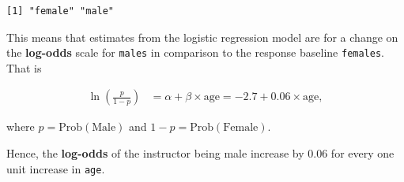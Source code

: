 \documentclass[
  letterpaper,
  DIV=11,
  numbers=noendperiod]{scrartcl}
\newenvironment{Shaded}{\begin{snugshade}}{\end{snugshade}}
\newcommand{\FunctionTok}[1]{\textcolor[rgb]{0.28,0.35,0.67}{#1}}
\newcommand{\NormalTok}[1]{\textcolor[rgb]{0.00,0.23,0.31}{#1}}
\newcommand{\SpecialCharTok}[1]{\textcolor[rgb]{0.37,0.37,0.37}{#1}}
\begin{document}
\begin{Shaded}
\end{Shaded}

\begin{verbatim}
[1] "female" "male"  
\end{verbatim}

This means that estimates from the logistic regression model are for a
change on the \textbf{log-odds} scale for \texttt{males} in comparison
to the response baseline \texttt{females}. That is

\begin{align}
\ln\left(\frac{p}{1-p}\right) &= \alpha + \beta \times \textrm{age} = -2.7 + 0.06 \times \textrm{age}, \nonumber
\end{align}

where \(p = \textrm{Prob}\left(\textrm{Male}\right)\) and
\(1 - p = \textrm{Prob}\left(\textrm{Female}\right)\).

Hence, the \textbf{log-odds} of the instructor being male increase by
0.06 for every one unit increase in \texttt{age}.
\end{document}
